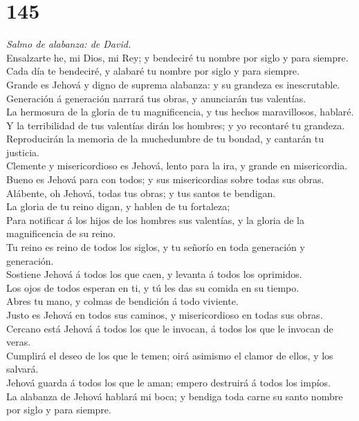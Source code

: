 \hypertarget{section-144}{%
\section{145}\label{section-144}}

 \emph{Salmo de alabanza: de David.}\\
Ensalzarte he, mi Dios, mi Rey; y bendeciré tu nombre por siglo y para
siempre.\\
 Cada día te bendeciré, y alabaré tu nombre por siglo y para
siempre.\\
 Grande es Jehová y digno de suprema alabanza: y su grandeza
es inescrutable.\\
 Generación á generación narrará tus obras, y anunciarán tus
valentías.\\
 La hermosura de la gloria de tu magnificencia, y tus hechos
maravillosos, hablaré.\\
 Y la terribilidad de tus valentías dirán los hombres; y yo
recontaré tu grandeza.\\
 Reproducirán la memoria de la muchedumbre de tu bondad, y
cantarán tu justicia.\\
 Clemente y misericordioso es Jehová, lento para la ira, y
grande en misericordia.\\
 Bueno es Jehová para con todos; y sus misericordias sobre
todas sus obras.\\
 Alábente, oh Jehová, todas tus obras; y tus santos te
bendigan.\\
 La gloria de tu reino digan, y hablen de tu fortaleza;\\
 Para notificar á los hijos de los hombres sus valentías, y
la gloria de la magnificencia de su reino.\\
 Tu reino es reino de todos los siglos, y tu señorío en
toda generación y generación.\\
 Sostiene Jehová á todos los que caen, y levanta á todos
los oprimidos.\\
 Los ojos de todos esperan en ti, y tú les das su comida en
su tiempo.\\
 Abres tu mano, y colmas de bendición á todo viviente.\\
 Justo es Jehová en todos sus caminos, y misericordioso en
todas sus obras.\\
 Cercano está Jehová á todos los que le invocan, á todos
los que le invocan de veras.\\
 Cumplirá el deseo de los que le temen; oirá asimismo el
clamor de ellos, y los salvará.\\
 Jehová guarda á todos los que le aman; empero destruirá á
todos los impíos.\\
 La alabanza de Jehová hablará mi boca; y bendiga toda
carne su santo nombre por siglo y para siempre.

